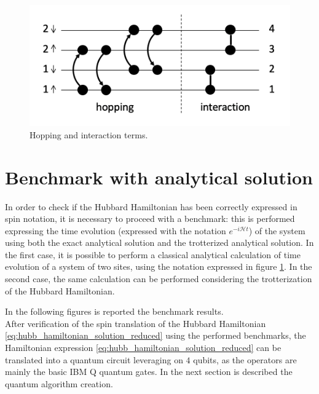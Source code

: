 \documentclass[twoside,twocolumn]{article}
\begin{document}
\begin{figure}
  \includegraphics[width=\linewidth]{img/hamiltonian_terms.jpg}
  \caption{Hopping and interaction terms.}
  \label{fig:hamiltonian_terms}
\end{figure}



\section{Benchmark with analytical solution}

In order to check if the Hubbard Hamiltonian has been correctly expressed in spin notation, it is necessary to proceed with a benchmark: this is performed
expressing the time evolution (expressed with the notation $e^{-i\mathcal{H}t}$) of the system using both the exact analytical solution and the trotterized analytical solution.
In the first case, it is possible to perform a classical analytical calculation of time evolution of a system of two sites, using the notation
expressed in figure \ref{fig:hamiltonian_terms}.
In the second case, the same calculation can be performed considering the trotterization of the Hubbard Hamiltonian.

In the following figures is reported the benchmark results.\\


After verification of the spin translation of the Hubbard Hamiltonian \ref{eq:hubb_hamiltonian_solution_reduced} using the performed benchmarks,
the Hamiltonian expression \ref{eq:hubb_hamiltonian_solution_reduced} can be translated into a quantum circuit leveraging
on $4$ qubits, as the operators are mainly the basic IBM Q quantum gates. In the next section is described
the quantum algorithm creation.
\end{document}
